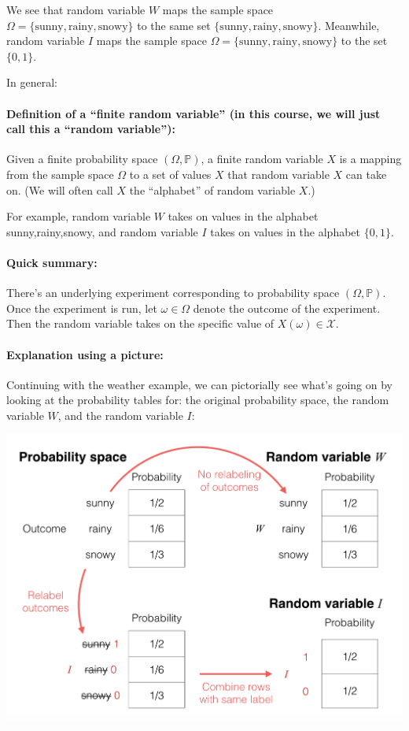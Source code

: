 \documentclass[6008notes.tex]{subfiles}
\begin{document}
We see that random variable $W$ maps the sample space $\Omega =\{ \text {sunny},\text {rainy},\text {snowy}\}$ to the same set $\{ \text {sunny},\text {rainy},\text {snowy}\}$. Meanwhile, random variable $I$ maps the sample space $\Omega =\{ \text {sunny},\text {rainy},\text {snowy}\}$ to the set $\{ 0,1\}$.

In general:

\paragraph{Definition of a ``finite random variable'' (in this course, we will just call this a ``random variable''):} Given a finite probability space $(\Omega , \mathbb {P})$, a finite random variable $X$ is a mapping from the sample space $\Omega$ to a set of values $X$ that random variable $X$ can take on. (We will often call $X$ the ``alphabet'' of random variable $X$.)

For example, random variable $W$ takes on values in the alphabet {sunny,rainy,snowy}, and random variable $I$ takes on values in the alphabet $\{ 0,1\}$.

\paragraph{Quick summary:} There's an underlying experiment corresponding to probability space $(\Omega , \mathbb {P})$. Once the experiment is run, let $\omega \in \Omega$ denote the outcome of the experiment. Then the random variable takes on the specific value of $X(\omega )\in \mathcal{X}$.

\paragraph{Explanation using a picture:} Continuing with the weather example, we can pictorially see what's going on by looking at the probability tables for: the original probability space, the random variable $W$, and the random variable $I$:

{\centering\includegraphics[scale=0.4]{images_sec-random-variables-main} \par}
\end{document}
